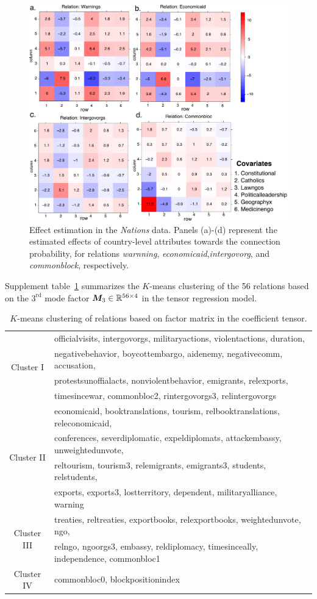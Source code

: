 \documentclass[11pt]{article}
\theoremstyle{plain}
\theoremstyle{definition}
\begin{document}
\begin{figure}[H]
\centering
\includegraphics[width=12cm]{coef.pdf}
\caption{Effect estimation in the \emph{Nations} data. Panels (a)-(d) represent the estimated effects of country-level attributes towards the connection probability, for relations \emph{warnning}, \emph{economicaid},\emph{intergovorg}, and \emph{commonblock}, respectively. }\label{fig:est}
\end{figure}
Supplement table~\ref{tab:s1} summarizes the $K$-means clustering of the 56 relations based on the $3^{\text{rd}}$ mode factor $\bm M_3\in\mathbb{R}^{56\times 4}$ in the tensor regression model. 

\begin{table}[ht]
\begin{tabular}{c|l}
\hline
\multirow{4}{*}{Cluster I}  &officialvisits, intergovorgs,  militaryactions, violentactions, duration, \\
&negativebehavior, boycottembargo, aidenemy, negativecomm, accusation, \\
& protestsunoffialacts,    nonviolentbehavior, emigrants, relexports,   \\
& timesincewar, commonbloc2, rintergovorgs3, relintergovorgs\\
\hline
\multirow{4}{*}{Cluster II}& economicaid, booktranslations, tourism, relbooktranslations, releconomicaid, \\
& conferences, severdiplomatic, expeldiplomats, attackembassy, unweightedunvote,\\
& reltourism, tourism3, relemigrants, emigrants3, students, relstudents, \\
&exports, exports3, lostterritory, dependent, militaryalliance, warning  \\
\hline
\multirow{2}{*}{Cluster III} & treaties, reltreaties, exportbooks, relexportbooks, weightedunvote, ngo, \\
&relngo, ngoorgs3, embassy, reldiplomacy, timesinceally, independence, commonbloc1\\
\hline
Cluster IV & commonbloc0, blockpositionindex\\
\hline
\end{tabular}
\caption{$K$-means clustering of relations based on factor matrix in the coefficient tensor.}\label{tab:s1}
\end{table}

\clearpage


\end{document}
